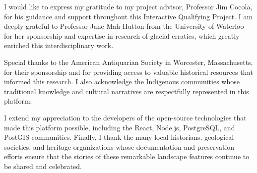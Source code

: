 \documentclass[
11pt, %
english, %
singlespacing, %
headsepline, %
]{MastersDoctoralThesis} %
\begin{document}
\begin{acknowledgements}
\addchaptertocentry{\acknowledgementname} %

I would like to express my gratitude to my project advisor, Professor Jim Cocola, for his guidance and support throughout this Interactive Qualifying Project. I am deeply grateful to Professor Jane Mah Hutton from the University of Waterloo for her sponsorship and expertise in research of glacial erratics, which greatly enriched this interdisciplinary work.

Special thanks to the American Antiquarian Society in Worcester, Massachusetts, for their sponsorship and for providing access to valuable historical resources that informed this research. I also acknowledge the Indigenous communities whose traditional knowledge and cultural narratives are respectfully represented in this platform.

I extend my appreciation to the developers of the open-source technologies that made this platform possible, including the React, Node.js, PostgreSQL, and PostGIS communities. Finally, I thank the many local historians, geological societies, and heritage organizations whose documentation and preservation efforts ensure that the stories of these remarkable landscape features continue to be shared and celebrated.

\end{acknowledgements}

\end{document}
